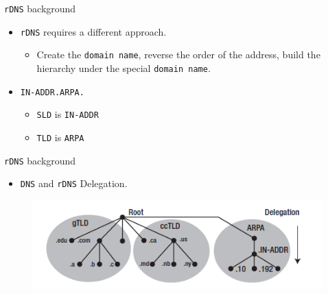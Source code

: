 \documentclass[xcolor=table]{beamer}
\begin{document}
\begin{frame}{\texttt{rDNS} background}
  \begin{itemize}
    \item \texttt{rDNS} requires a different approach.
      \begin{itemize}
        \item Create the \texttt{domain name}, reverse the order of the address, build the hierarchy under the special \texttt{domain name}.
      \end{itemize}
    \item \texttt{IN-ADDR.ARPA.}
      \begin{itemize}
        \item \texttt{SLD} is \texttt{IN-ADDR}
        \item \texttt{TLD} is \texttt{ARPA}
      \end{itemize}
  \end{itemize}
\end{frame}

\begin{frame}{\texttt{rDNS} background}
  \begin{itemize}
    \item \texttt{DNS} and \texttt{rDNS} Delegation. 
  \end{itemize}
  \begin{figure}
    \begin{center}
      \includegraphics[width=1\linewidth]{Delegate.png}
    \end{center}
  \end{figure}
\end{frame}
\end{document}
